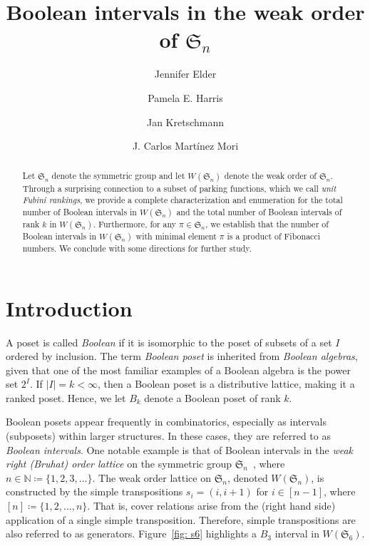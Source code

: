\documentclass[11pt,reqno]{amsart}
\title{Boolean intervals in the weak order of $\mathfrak{S}_n$}
\author[Elder]{Jennifer Elder}
\author[Harris]{Pamela E. Harris}
\author[Kretschmann]{Jan Kretschmann}
\author[Mart\'inez Mori]{J. Carlos Mart\'inez Mori}
\theoremstyle{definition}
\theoremstyle{notation}
\theoremstyle{openproblem}
\newcommand*{\N}{\mathbb{N}}
\newcommand{\Sym}{\mathfrak{S}}
\begin{document}

\begin{abstract}
Let $\mathfrak{S}_n$ denote the symmetric group and let
 $W(\mathfrak{S}_n)$ denote the weak order of $\mathfrak{S}_n$.
Through a surprising connection to a subset of parking functions, which we call \emph{unit Fubini rankings}, we provide a complete characterization and enumeration for 
the total number of Boolean intervals in $W(\Sym_n)$ and 
 the total number of Boolean intervals of rank $k$ in $W(\Sym_n)$. 
 Furthermore, for any $\pi\in\Sym_n$, we establish that the number of Boolean intervals in $W(\Sym_n)$ with minimal element $\pi$ is a product of Fibonacci numbers. 
We conclude with some directions for further study.
\end{abstract}

\maketitle


\section{Introduction}

A poset is called \emph{Boolean} if it is isomorphic to the poset of subsets of a set $I$ ordered by inclusion.
The term \emph{Boolean poset} is inherited from \textit{Boolean algebras}, given that one of the most familiar examples of a Boolean algebra is the power set $2^{I}$. 
If $|I| = k < \infty$, then a Boolean poset is a distributive lattice, making it a ranked poset. 
Hence, we let $B_k$ denote a Boolean poset of rank $k$.

Boolean posets appear frequently in combinatorics, especially as intervals (subposets) within larger structures.
In these cases, they are referred to as \emph{Boolean intervals}.
One notable example is that of Boolean intervals in the \textit{weak right (Bruhat) order lattice} on the symmetric group $\Sym_{n}$~\cite{Bjorner2005OnTS, Tenner2005,Tenner_Intervals,TENNER2007888}, where $n \in \N \coloneqq\{1,2,3,\ldots\}$. 
The weak order lattice on $\Sym_n$, denoted $W(\Sym_n)$, is constructed by the simple transpositions $s_i = (i,i+1)$ for $i \in [n-1]$, where $[n] \coloneqq \{1, 2, \ldots, n\}$.
That is, cover relations arise from the (right hand side) application of a single simple transposition.
Therefore, simple transpositions are also referred to as generators.
Figure~\ref{fig: s6} highlights a $B_3$ interval in $W(\Sym_6)$.
\end{document}
